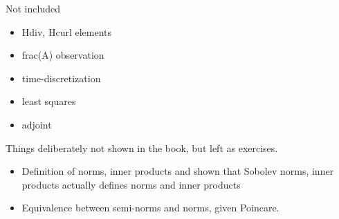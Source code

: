 
Not included 
\begin{itemize}
\item Hdiv, Hcurl elements 
\item frac(A) observation 
\item time-discretization 
\item least squares 
\item adjoint 
\end{itemize}

Things deliberately not shown in
the book, but left as exercises. 
\begin{itemize}
\item Definition of norms, inner products and shown that Sobolev norms, inner products actually defines norms
and inner products  

\item Equivalence between semi-norms and norms, given Poincare. 
\end{itemize}

